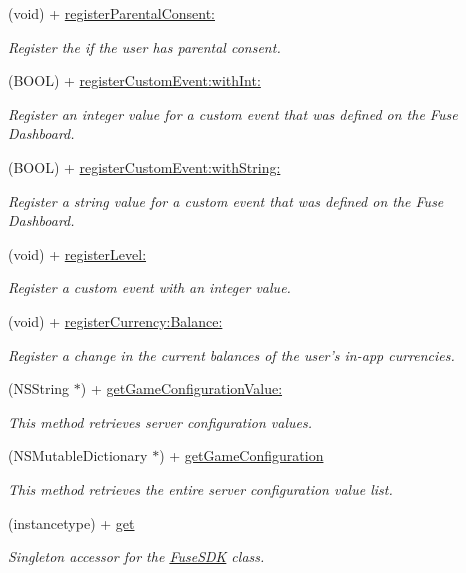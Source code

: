 \begin{DoxyCompactItemize}
(void) + \hyperlink{interface_fuse_s_d_k_ada39e47884f25fc5e6bb1a0acf1831db}{register\+Parental\+Consent\+:}
\begin{DoxyCompactList}\small\item\em Register the if the user has parental consent. \end{DoxyCompactList}\item 
(B\+O\+O\+L) + \hyperlink{interface_fuse_s_d_k_a5ad914282112a76cdb9a0692803b4b38}{register\+Custom\+Event\+:with\+Int\+:}
\begin{DoxyCompactList}\small\item\em Register an integer value for a custom event that was defined on the Fuse Dashboard. \end{DoxyCompactList}\item 
(B\+O\+O\+L) + \hyperlink{interface_fuse_s_d_k_a4ed3ac41f2d30b078c909b2fa03d913a}{register\+Custom\+Event\+:with\+String\+:}
\begin{DoxyCompactList}\small\item\em Register a string value for a custom event that was defined on the Fuse Dashboard. \end{DoxyCompactList}\item 
(void) + \hyperlink{interface_fuse_s_d_k_a37448397d10db8278e2e45d0448c4fa0}{register\+Level\+:}
\begin{DoxyCompactList}\small\item\em Register a custom event with an integer value. \end{DoxyCompactList}\item 
(void) + \hyperlink{interface_fuse_s_d_k_ac07a77edd3b1eeddfe96dba096f15273}{register\+Currency\+:\+Balance\+:}
\begin{DoxyCompactList}\small\item\em Register a change in the current balances of the user's in-\/app currencies. \end{DoxyCompactList}\item 
(N\+S\+String $\ast$) + \hyperlink{interface_fuse_s_d_k_ab29213306801eba35d922754a5efa1b0}{get\+Game\+Configuration\+Value\+:}
\begin{DoxyCompactList}\small\item\em This method retrieves server configuration values. \end{DoxyCompactList}\item 
(N\+S\+Mutable\+Dictionary $\ast$) + \hyperlink{interface_fuse_s_d_k_a0267e0bb12395c93cea9442f62dcc53e}{get\+Game\+Configuration}
\begin{DoxyCompactList}\small\item\em This method retrieves the entire server configuration value list. \end{DoxyCompactList}\item 
(instancetype) + \hyperlink{interface_fuse_s_d_k_a01b0d405cef0701ca335624d9910fa6f}{get}
\begin{DoxyCompactList}\small\item\em Singleton accessor for the \hyperlink{interface_fuse_s_d_k}{Fuse\+S\+D\+K} class. \end{DoxyCompactList}\end{DoxyCompactItemize}

